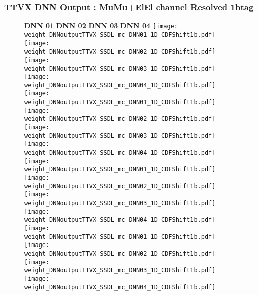 \documentclass[9pt]{beamer}
\begin{document}
\begin{frame}
	\frametitle{TTVX DNN Output : MuMu+ElEl channel Resolved 1btag}
	\begin{figure}
	    \textbf{DNN 01} \hspace{1.2cm} \textbf{DNN 02} \hspace{1.2cm} \textbf{DNN 03} \hspace{1.2cm} \textbf{DNN 04}
        \centering
		\texttt{[image: weight\_DNNoutputTTVX\_SSDL\_mc\_DNN01\_1D\_CDFShift1b.pdf]}
		\texttt{[image: weight\_DNNoutputTTVX\_SSDL\_mc\_DNN02\_1D\_CDFShift1b.pdf]}
		\texttt{[image: weight\_DNNoutputTTVX\_SSDL\_mc\_DNN03\_1D\_CDFShift1b.pdf]}
		\texttt{[image: weight\_DNNoutputTTVX\_SSDL\_mc\_DNN04\_1D\_CDFShift1b.pdf]}\\
		\texttt{[image: weight\_DNNoutputTTVX\_SSDL\_mc\_DNN01\_1D\_CDFShift1b.pdf]}
		\texttt{[image: weight\_DNNoutputTTVX\_SSDL\_mc\_DNN02\_1D\_CDFShift1b.pdf]}
		\texttt{[image: weight\_DNNoutputTTVX\_SSDL\_mc\_DNN03\_1D\_CDFShift1b.pdf]}
		\texttt{[image: weight\_DNNoutputTTVX\_SSDL\_mc\_DNN04\_1D\_CDFShift1b.pdf]}\\
		\texttt{[image: weight\_DNNoutputTTVX\_SSDL\_mc\_DNN01\_1D\_CDFShift1b.pdf]}
		\texttt{[image: weight\_DNNoutputTTVX\_SSDL\_mc\_DNN02\_1D\_CDFShift1b.pdf]}
		\texttt{[image: weight\_DNNoutputTTVX\_SSDL\_mc\_DNN03\_1D\_CDFShift1b.pdf]}
		\texttt{[image: weight\_DNNoutputTTVX\_SSDL\_mc\_DNN04\_1D\_CDFShift1b.pdf]}\\
		\texttt{[image: weight\_DNNoutputTTVX\_SSDL\_mc\_DNN01\_1D\_CDFShift1b.pdf]}
		\texttt{[image: weight\_DNNoutputTTVX\_SSDL\_mc\_DNN02\_1D\_CDFShift1b.pdf]}
		\texttt{[image: weight\_DNNoutputTTVX\_SSDL\_mc\_DNN03\_1D\_CDFShift1b.pdf]}
		\texttt{[image: weight\_DNNoutputTTVX\_SSDL\_mc\_DNN04\_1D\_CDFShift1b.pdf]}\\
	\end{figure}
\end{frame}
\end{document}
